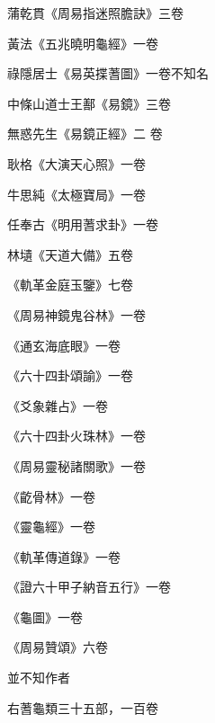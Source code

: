 \begin{pinyinscope}
 蒲乾貫《周易指迷照膽訣》三卷



 黃法《五兆曉明龜經》一卷



 祿隱居士《易英揲蓍圖》一卷不知名



 中條山道士王鄯《易鏡》三卷



 無惑先生《易鏡正經》二
 卷



 耿格《大演天心照》一卷



 牛思純《太極寶局》一卷



 任奉古《明用蓍求卦》一卷



 林壝《天道大備》五卷



 《軌革金庭玉鑒》七卷



 《周易神鏡鬼谷林》一卷



 《通玄海底眼》一卷



 《六十四卦頌諭》一卷



 《爻象雜占》一卷



 《六十四卦火珠林》一卷



 《周易靈秘諸關歌》一卷



 《齕骨林》一卷



 《靈龜經》一卷



 《軌革傳道錄》一卷



 《證六十甲子納音五行》一卷



 《龜圖》一卷



 《周易贊頌》六卷



 並不知作者



 右蓍龜類三十五部，一百卷



\end{pinyinscope}